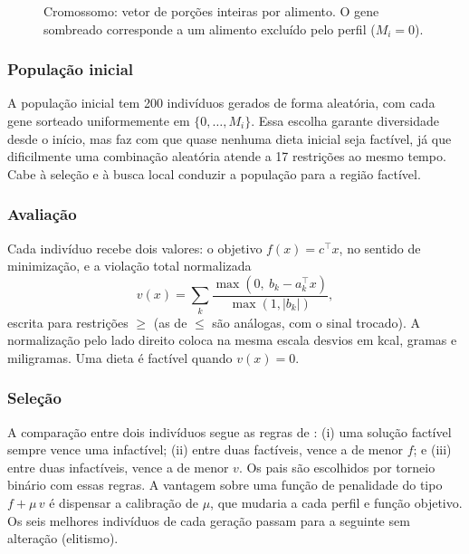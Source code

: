 \documentclass[12pt]{article}
\begin{document}
\begin{figure}[ht]
\centering

\caption{Cromossomo: vetor de porções inteiras por alimento. O gene sombreado
corresponde a um alimento excluído pelo perfil ($M_i = 0$).}\label{fig:cromossomo}
\end{figure}

\subsubsection{População inicial}

A população inicial tem 200 indivíduos gerados de forma aleatória, com cada gene
sorteado uniformemente em $\{0, \dots, M_i\}$. Essa escolha garante diversidade desde
o início, mas faz com que quase nenhuma dieta inicial seja factível, já que dificilmente
uma combinação aleatória atende a 17 restrições ao mesmo tempo. Cabe à seleção e à
busca local conduzir a população para a região factível.

\subsubsection{Avaliação}

Cada indivíduo recebe dois valores: o objetivo $f(x) = c^\top x$, no sentido de
minimização, e a violação total normalizada
\begin{equation}
v(x) = \sum_{k} \frac{\max\left(0, \ b_k - a_k^\top x\right)}{\max(1, |b_k|)},
\label{eq:violacao}
\end{equation}
escrita para restrições $\geq$ (as de $\leq$ são análogas, com o sinal trocado). A
normalização pelo lado direito coloca na mesma escala desvios em kcal, gramas e
miligramas. Uma dieta é factível quando $v(x) = 0$.

\subsubsection{Seleção}

A comparação entre dois indivíduos segue as regras de \cite{deb2000}: (i) uma solução
factível sempre vence uma infactível; (ii) entre duas factíveis, vence a de menor $f$;
e (iii) entre duas infactíveis, vence a de menor $v$. Os pais são escolhidos por torneio
binário com essas regras. A vantagem sobre uma função de penalidade do tipo
$f + \mu\, v$ é dispensar a calibração de $\mu$, que mudaria a cada perfil e função
objetivo. Os seis melhores indivíduos de cada geração passam para a seguinte sem
alteração (elitismo).
\end{document}
